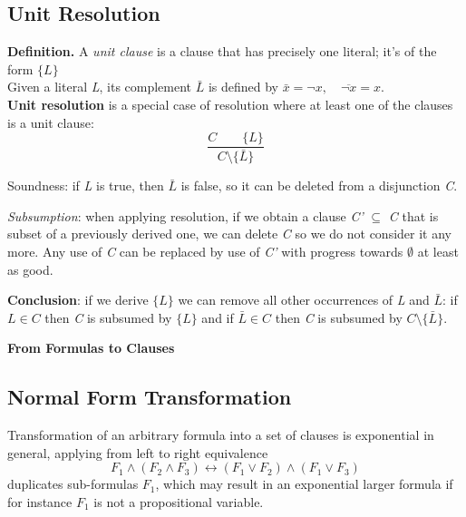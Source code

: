 \documentclass[11pt]{article}
\begin{document}
\subsection*{Unit Resolution}

\begin{tcolorbox}[
    enhanced,
    frame hidden,
    borderline west={2pt}{0pt}{black},
    boxsep=5pt,
    left=8pt
]
\textbf{Definition.} A \textit{unit clause} is a clause that has precisely one literal; it's of the form $\{L\}$ \\
Given a literal \textit{L}, its complement $\bar{L}$ is defined by $\bar{x} = \neg x, \quad \overline{\neg x} = x$. \\

\textbf{Unit resolution} is a special case of resolution where at least one of the clauses is a unit clause: $$\frac{C \quad \quad \{L\}}{C \setminus \{\bar{L}\}}$$

Soundness: if \textit{L} is true, then $\bar{L}$ is false, so it can be deleted from a disjunction \textit{C}.
\end{tcolorbox}

\emph{Subsumption}: when applying resolution, if we obtain a clause \textit{C'} $\subseteq$ \textit{C} that is subset of a previously derived one, we can delete \textit{C} so we do not consider it any more. Any use of \textit{C} can be replaced by use of \textit{C'} with progress towards $\emptyset$ at least as good. 

\textbf{Conclusion}: if we derive $\{L\}$ we can remove all other occurrences of \textit{L} and $\bar{L}$: if $L \in C$ then \textit{C} is subsumed by $\{L\}$ and if $\bar{L} \in C$ then \textit{C} is subsumed by $C \setminus \{\bar{L}\}$. 

\vspace{0.5cm}

\begin{center}
  {\LARGE \textbf{From Formulas to Clauses}}
\end{center}
\vspace{0.5cm}

\subsection*{Normal Form Transformation}

Transformation of an arbitrary formula into a set of clauses is exponential in general, applying from left to right equivalence $$F_1 \land (F_2 \land F_3) \leftrightarrow (F_1 \lor F_2) \land (F_1 \lor F_3)$$ duplicates sub-formulas $F_1$, which may result in an exponential larger formula if for instance $F_1$ is not a propositional variable. 
\end{document}
